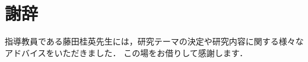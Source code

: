 \documentclass[main]{subfiles}
\begin{document}
\chapter*{謝辞}

指導教員である藤田桂英先生には，研究テーマの決定や研究内容に関する様々なアドバイスをいただきました．
この場をお借りして感謝します．
\end{document}

